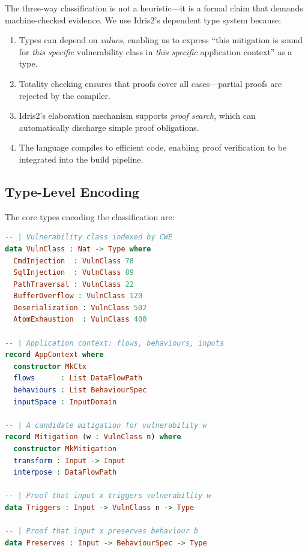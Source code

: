 \documentclass[11pt,twocolumn]{article}
\begin{document}
The three-way classification is not a heuristic---it is a formal
claim that demands machine-checked evidence. We use Idris2's
dependent type system because:

\begin{enumerate}[nosep]
  \item Types can depend on \emph{values}, enabling us to express
    ``this mitigation is sound for \emph{this specific} vulnerability
    class in \emph{this specific} application context'' as a type.
  \item Totality checking ensures that proofs cover all cases---partial
    proofs are rejected by the compiler.
  \item Idris2's elaboration mechanism supports \emph{proof search},
    which can automatically discharge simple proof obligations.
  \item The language compiles to efficient code, enabling proof
    verification to be integrated into the build pipeline.
\end{enumerate}

\subsection{Type-Level Encoding}

The core types encoding the classification are:

\begin{lstlisting}[language=Idris,caption={Mitigation classification types in Idris2},label=lst:idris-types]
-- | Vulnerability class indexed by CWE
data VulnClass : Nat -> Type where
  CmdInjection  : VulnClass 78
  SqlInjection  : VulnClass 89
  PathTraversal : VulnClass 22
  BufferOverflow : VulnClass 120
  Deserialization : VulnClass 502
  AtomExhaustion  : VulnClass 400

-- | Application context: flows, behaviours, inputs
record AppContext where
  constructor MkCtx
  flows      : List DataFlowPath
  behaviours : List BehaviourSpec
  inputSpace : InputDomain

-- | A candidate mitigation for vulnerability w
record Mitigation (w : VulnClass n) where
  constructor MkMitigation
  transform : Input -> Input
  interpose : DataFlowPath

-- | Proof that input x triggers vulnerability w
data Triggers : Input -> VulnClass n -> Type

-- | Proof that input x preserves behaviour b
data Preserves : Input -> BehaviourSpec -> Type
\end{lstlisting}
\end{document}
